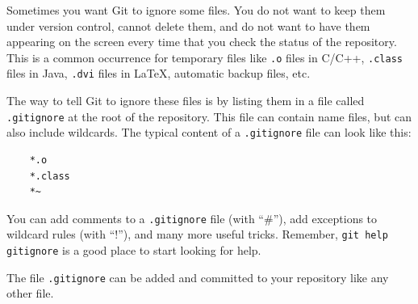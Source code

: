 Sometimes you want Git to ignore some files. You do not want to keep
them under version control, cannot delete them, and do not want to
have them appearing on the screen every time that you check the status
of the repository. This is a common occurrence for temporary files
like \verb+.o+ files in C/C++, \verb+.class+ files in Java,
\verb+.dvi+ files in \LaTeX, automatic backup files, etc.

The way to tell Git to ignore these files is by listing them in a file
called \verb+.gitignore+ at the root of the repository. This file can
contain name files, but can also include wildcards. The typical
content of a \verb+.gitignore+ file can look like this:

\begin{verbatim}
    *.o
    *.class
    *~
\end{verbatim}

You can add comments to a \verb+.gitignore+ file (with ``\#''), add
exceptions to wildcard rules (with ``!''), and many more useful
tricks. Remember, \verb+git help gitignore+ is a good place to start
looking for help. 

The file \verb+.gitignore+ can be added and committed to your
repository like any other file.





